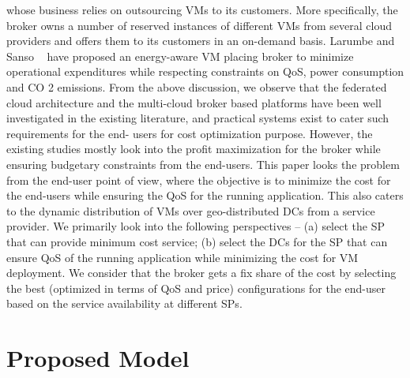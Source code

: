 \documentclass[12pt,a4paper,twoside,openright]{report}
\newcommand\tab[1][0.8cm]{\hspace*{#1}}
\begin{document}
whose business relies on outsourcing VMs to its customers.
More specifically, the broker owns a number of reserved
instances of different VMs from several cloud providers and
offers them to its customers in an on-demand basis. Larumbe
and Sanso ~\cite{b10} have proposed an energy-aware VM placing
broker to minimize operational expenditures while respecting
constraints on QoS, power consumption and CO 2 emissions.
\newline
\tab From the above discussion, we observe that the federated
cloud architecture and the multi-cloud broker based platforms
have been well investigated in the existing literature, and practical systems exist to cater such requirements for the end-
users for cost optimization purpose. However, the existing
studies mostly look into the profit maximization for the broker
while ensuring budgetary constraints from the end-users. This
paper looks the problem from the end-user point of view,
where the objective is to minimize the cost for the end-users
while ensuring the QoS for the running application. This also
caters to the dynamic distribution of VMs over geo-distributed
DCs from a service provider. We primarily look into the
following perspectives – (a) select the SP that can provide
minimum cost service; (b) select the DCs for the SP that can
ensure QoS of the running application while minimizing the
cost for VM deployment. We consider that the broker gets a
fix share of the cost by selecting the best (optimized in terms
of QoS and price) configurations for the end-user based on the
service availability at different SPs.


\chapter{Proposed Model}\label{ch:ch3}
\end{document}
